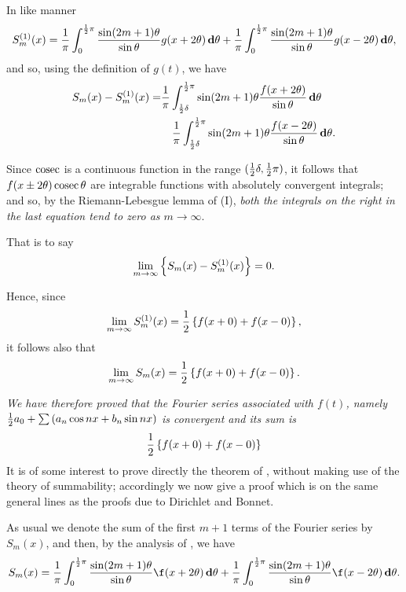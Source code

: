 In like manner
$$
S_{m}^{(1)}(x)
=
\frac{1}{\pi}
\int_{0}^{\frac{1}{2} \pi}
\frac{\sin (2m+1)\theta}{\sin \theta}
g(x + 2\theta) \, \mathbf{d} \theta
+
\frac{1}{\pi}
\int_{0}^{\frac{1}{2} \pi}
\frac{\sin (2m+1)\theta}{\sin \theta}
g(x - 2\theta) \, \mathbf{d} \theta,
$$
and so, using the definition of $g(t)$, we have
\begin{align*}
  S_{m}(x) - S_{m}^{(1)}(x)
  =&
  \frac{1}{\pi}
  \int_{\frac{1}{2}\delta}^{\frac{1}{2} \pi} \sin (2m+1)\theta
  \frac{f(x+2\theta)}{\sin \theta}
  \, \mathbf{d} \theta
  \\
  &\quad
  \frac{1}{\pi}
  \int_{\frac{1}{2}\delta}^{\frac{1}{2} \pi} \sin (2m+1)\theta
  \frac{f(x-2\theta)}{\sin \theta}
  \, \mathbf{d} \theta.
\end{align*}

Since $\operatorname{cosec}$ is a continuous function in the range $(\frac{1}{2} \delta, \frac{1}{2} \pi)$, it follows
that $f(x \pm 2\theta) \operatorname{cosec} \theta$ are integrable functions with absolutely
convergent integrals; and so, by the Riemann-Lebesgue lemma of
 (I), %
\emph{both the integrals on the right in the last equation tend to zero
as $m \rightarrow \infty$}.

That is to say
$$
\lim_{m \rightarrow \infty}
\left\{ 
  S_{m}(x) - S_{m}^{(1)}(x)
 \right\}
= 0.
$$

Hence, since
$$
\lim_{m \rightarrow \infty}
S_{m}^{(1)}(x)
=
\frac{1}{2} \left\{ 
  f(x+0) + f(x-0)
 \right\},
$$
it follows also that
$$
\lim_{m \rightarrow \infty} S_{m}(x)
=
\frac{1}{2} \left\{ 
  f(x+0) + f(x-0)
 \right\}.
$$

\emph{We have therefore proved that the Fourier series associated with
  $f(t)$, namely
  $
  \frac{1}{2} a_{0}
  + \sum \left( 
    a_{n} \cos nx
    +
    b_{n} \sin nx
   \right)
  $
  is convergent and its sum is}
$$
\frac{1}{2} \left\{ 
  f(x+0) + f(x-0)
 \right\}
$$
It is of some interest to prove directly the theorem of ,
without making use of the theory of summability; accordingly we now
give a proof which is on the same general lines as the proofs due to
Dirichlet and Bonnet.
%
%

As usual we denote the sum of the first $m + 1$ terms of the Fourier
series by $S_{m}(x)$, and then, by the analysis of , we have
$$
S_{m}(x)
=
\frac{1}{\pi}
\int_{0}^{\half \pi}
\frac{\sin (2m+1)\theta}{\sin \theta}
\f(x + 2\theta)
\dmeasure \theta
+
\frac{1}{\pi}
\int_{0}^{\half \pi}
\frac{\sin (2m+1)\theta}{\sin \theta}
\f(x - 2\theta)
\dmeasure \theta.
$$

